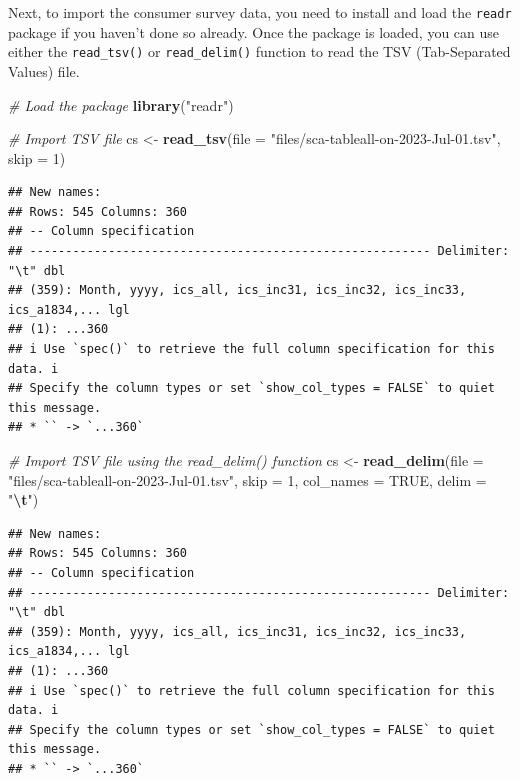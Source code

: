 \documentclass[
]{book}
\newenvironment{Shaded}{\begin{snugshade}}{\end{snugshade}}
\newcommand{\AttributeTok}[1]{\textcolor[rgb]{0.13,0.29,0.53}{#1}}
\newcommand{\CommentTok}[1]{\textcolor[rgb]{0.56,0.35,0.01}{\textit{#1}}}
\newcommand{\ConstantTok}[1]{\textcolor[rgb]{0.56,0.35,0.01}{#1}}
\newcommand{\DecValTok}[1]{\textcolor[rgb]{0.00,0.00,0.81}{#1}}
\newcommand{\FunctionTok}[1]{\textcolor[rgb]{0.13,0.29,0.53}{\textbf{#1}}}
\newcommand{\NormalTok}[1]{#1}
\newcommand{\OtherTok}[1]{\textcolor[rgb]{0.56,0.35,0.01}{#1}}
\newcommand{\SpecialCharTok}[1]{\textcolor[rgb]{0.81,0.36,0.00}{\textbf{#1}}}
\newcommand{\StringTok}[1]{\textcolor[rgb]{0.31,0.60,0.02}{#1}}
\begin{document}
Next, to import the consumer survey data, you need to install and load the \texttt{readr} package if you haven't done so already. Once the package is loaded, you can use either the \texttt{read\_tsv()} or \texttt{read\_delim()} function to read the TSV (Tab-Separated Values) file.

\begin{Shaded}
\begin{Highlighting}[]
\CommentTok{\# Load the package}
\FunctionTok{library}\NormalTok{(}\StringTok{"readr"}\NormalTok{)}

\CommentTok{\# Import TSV file}
\NormalTok{cs }\OtherTok{\textless{}{-}} \FunctionTok{read\_tsv}\NormalTok{(}\AttributeTok{file =} \StringTok{"files/sca{-}tableall{-}on{-}2023{-}Jul{-}01.tsv"}\NormalTok{, }\AttributeTok{skip =} \DecValTok{1}\NormalTok{)}
\end{Highlighting}
\end{Shaded}

\begin{verbatim}
## New names:
## Rows: 545 Columns: 360
## -- Column specification
## -------------------------------------------------------- Delimiter: "\t" dbl
## (359): Month, yyyy, ics_all, ics_inc31, ics_inc32, ics_inc33, ics_a1834,... lgl
## (1): ...360
## i Use `spec()` to retrieve the full column specification for this data. i
## Specify the column types or set `show_col_types = FALSE` to quiet this message.
## * `` -> `...360`
\end{verbatim}

\begin{Shaded}
\begin{Highlighting}[]
\CommentTok{\# Import TSV file using the read\_delim() function}
\NormalTok{cs }\OtherTok{\textless{}{-}} \FunctionTok{read\_delim}\NormalTok{(}\AttributeTok{file =} \StringTok{"files/sca{-}tableall{-}on{-}2023{-}Jul{-}01.tsv"}\NormalTok{, }\AttributeTok{skip =} \DecValTok{1}\NormalTok{, }\AttributeTok{col\_names =} \ConstantTok{TRUE}\NormalTok{, }\AttributeTok{delim =} \StringTok{"}\SpecialCharTok{\textbackslash{}t}\StringTok{"}\NormalTok{)}
\end{Highlighting}
\end{Shaded}

\begin{verbatim}
## New names:
## Rows: 545 Columns: 360
## -- Column specification
## -------------------------------------------------------- Delimiter: "\t" dbl
## (359): Month, yyyy, ics_all, ics_inc31, ics_inc32, ics_inc33, ics_a1834,... lgl
## (1): ...360
## i Use `spec()` to retrieve the full column specification for this data. i
## Specify the column types or set `show_col_types = FALSE` to quiet this message.
## * `` -> `...360`
\end{verbatim}
\end{document}
